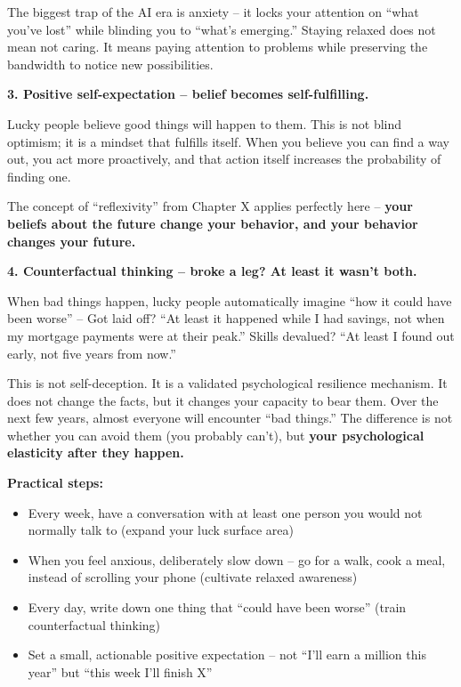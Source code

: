 \documentclass[11pt,a4paper]{article}
\begin{document}
The biggest trap of the AI era is anxiety -- it locks your attention on ``what you've lost'' while blinding you to ``what's emerging.'' Staying relaxed does not mean not caring. It means paying attention to problems while preserving the bandwidth to notice new possibilities.

\textbf{3. Positive self-expectation -- belief becomes self-fulfilling.}

Lucky people believe good things will happen to them. This is not blind optimism; it is a mindset that fulfills itself. When you believe you can find a way out, you act more proactively, and that action itself increases the probability of finding one.

The concept of ``reflexivity'' from Chapter X applies perfectly here -- \textbf{your beliefs about the future change your behavior, and your behavior changes your future.}

\textbf{4. Counterfactual thinking -- broke a leg? At least it wasn't both.}

When bad things happen, lucky people automatically imagine ``how it could have been worse'' -- Got laid off? ``At least it happened while I had savings, not when my mortgage payments were at their peak.'' Skills devalued? ``At least I found out early, not five years from now.''

This is not self-deception. It is a validated psychological resilience mechanism. It does not change the facts, but it changes your capacity to bear them. Over the next few years, almost everyone will encounter ``bad things.'' The difference is not whether you can avoid them (you probably can't), but \textbf{your psychological elasticity after they happen.}

\textbf{Practical steps:}

\begin{itemize}
  \item Every week, have a conversation with at least one person you would not normally talk to (expand your luck surface area)
  \item When you feel anxious, deliberately slow down -- go for a walk, cook a meal, instead of scrolling your phone (cultivate relaxed awareness)
  \item Every day, write down one thing that ``could have been worse'' (train counterfactual thinking)
  \item Set a small, actionable positive expectation -- not ``I'll earn a million this year'' but ``this week I'll finish X''
\end{itemize}
\end{document}
